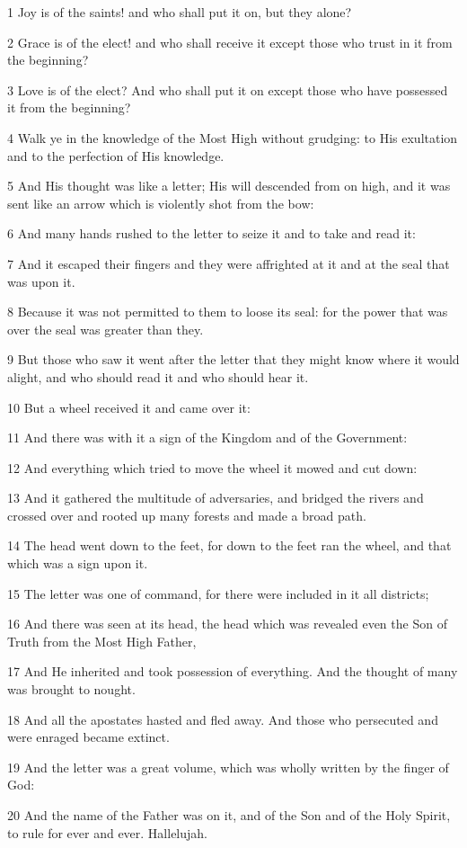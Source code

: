 \par 1 Joy is of the saints! and who shall put it on, but they alone?
\par 2 Grace is of the elect! and who shall receive it except those who trust in it from the beginning?
\par 3 Love is of the elect? And who shall put it on except those who have possessed it from the beginning?
\par 4 Walk ye in the knowledge of the Most High without grudging: to His exultation and to the perfection of His knowledge.
\par 5 And His thought was like a letter; His will descended from on high, and it was sent like an arrow which is violently shot from the bow:
\par 6 And many hands rushed to the letter to seize it and to take and read it:
\par 7 And it escaped their fingers and they were affrighted at it and at the seal that was upon it.
\par 8 Because it was not permitted to them to loose its seal: for the power that was over the seal was greater than they.
\par 9 But those who saw it went after the letter that they might know where it would alight, and who should read it and who should hear it.
\par 10 But a wheel received it and came over it:
\par 11 And there was with it a sign of the Kingdom and of the Government:
\par 12 And everything which tried to move the wheel it mowed and cut down:
\par 13 And it gathered the multitude of adversaries, and bridged the rivers and crossed over and rooted up many forests and made a broad path.
\par 14 The head went down to the feet, for down to the feet ran the wheel, and that which was a sign upon it.
\par 15 The letter was one of command, for there were included in it all districts;
\par 16 And there was seen at its head, the head which was revealed even the Son of Truth from the Most High Father,
\par 17 And He inherited and took possession of everything. And the thought of many was brought to nought.
\par 18 And all the apostates hasted and fled away. And those who persecuted and were enraged became extinct.
\par 19 And the letter was a great volume, which was wholly written by the finger of God:
\par 20 And the name of the Father was on it, and of the Son and of the Holy Spirit, to rule for ever and ever. Hallelujah.

